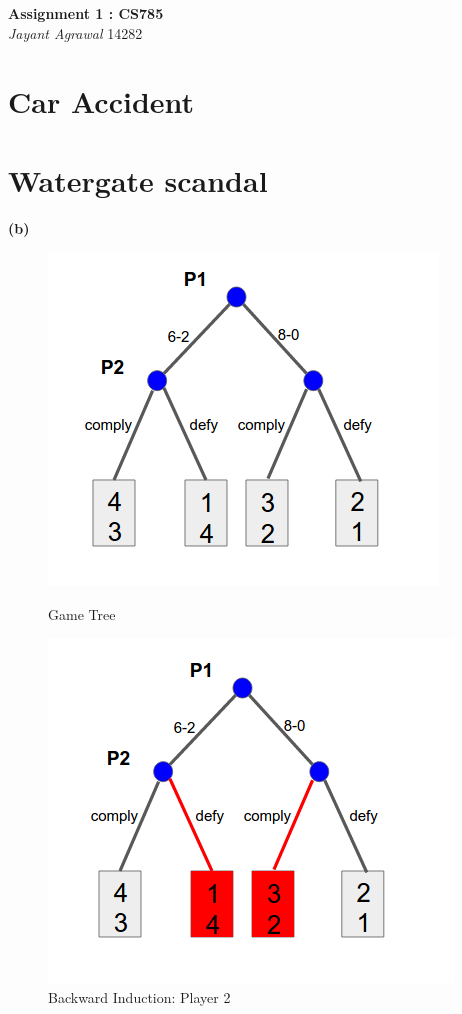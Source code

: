 \documentclass{article}
\begin{document}

\begin{center}
\textbf{\Large Assignment 1 : CS785} \\
\textit{\large Jayant Agrawal}         14282
\end{center}

\section{Car Accident}
\section{Watergate scandal}
\textbf{(b)}
\begin{figure}[h!]
\centering
\begin{multicols}{3}
\label{2_gt1}
\includegraphics[width=1\columnwidth]{2_gt1.png}
\caption{Game Tree}


\includegraphics[width=1\columnwidth]{2_gt2.png}
\caption{Backward Induction: Player 2}
\label{2_gt2}



\end{multicols}
\end{figure}
\end{document}
